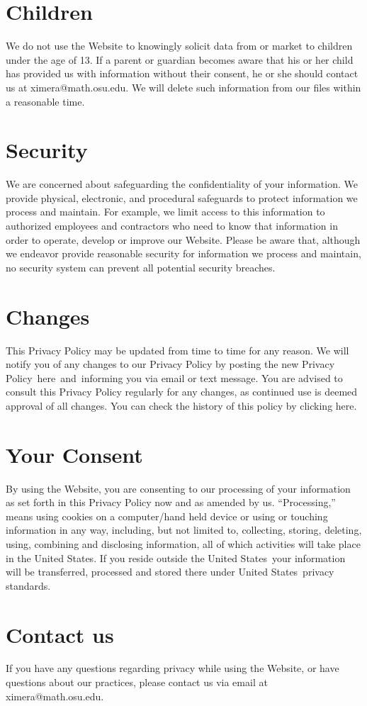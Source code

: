 \documentclass{ximera}
\begin{document}
\section{Children}\label{children}

We do not use the Website to knowingly solicit data from or market to
children under the age of 13. If a parent or guardian becomes aware
that his or her child has provided us with information without their
consent, he or she should contact us at ximera@math.osu.edu. We will
delete such information from our files within a reasonable time.

\section{Security}

We are concerned about safeguarding the confidentiality of your
information. We provide physical, electronic, and procedural
safeguards to protect information we process and maintain. For
example, we limit access to this information to authorized employees
and contractors who need to know that information in order to operate,
develop or improve our Website. Please be aware that, although we
endeavor provide reasonable security for information we process and
maintain, no security system can prevent all potential security
breaches.

\section{Changes}

This Privacy Policy may be updated from time to time for any reason. We
will notify you of any changes to our Privacy Policy by posting the new
Privacy Policy~here~and~informing you via email or text message. You are
advised to consult this Privacy Policy regularly for any changes, as
continued use is deemed approval of all changes. You can check the
history of this policy by clicking here.


\section{Your Consent}

By using the Website, you are consenting to our processing of your
information as set forth in this Privacy Policy now and as amended by
us. ``Processing,'' means using cookies on a computer/hand held device
or using or touching information in any way, including, but not
limited to, collecting, storing, deleting, using, combining and
disclosing information, all of which activities will take place in the
United States. If you reside outside the United States~your
information will be transferred, processed and stored there under
United States~privacy standards.~

\section{Contact us}

If you have any questions regarding privacy while using the Website,
or have questions about our practices, please contact us via email
at ximera@math.osu.edu.
\end{document}
